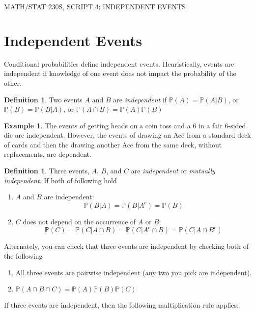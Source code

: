 \documentclass[12pt]{article}
\newcommand{\bbP}{\mathbb{P}}
\renewcommand{\_}[1]{\underline{ #1 }}
\theoremstyle{definition}
\newtheorem{definition}[theorem]{Definition}
\newtheorem{example}[theorem]{Example}
\numberwithin{equation}{subsection}
\begin{document}
\begin{center}
{\large MATH/STAT 230S, SCRIPT 4: INDEPENDENT EVENTS} \\ 
\vspace{.2in}  

\end{center}


\setcounter{section}{3}



\section{Independent Events}
Conditional probabilities define independent events. Heuristically, events are independent if knowledge of one event does not impact the probability of the other.
\begin{definition}
Two events $A$ and $B$ are \emph{independent} if $\bbP(A)=\bbP(A|B)$, or $\bbP(B)=\bbP(B|A)$, or $\bbP(A\cap B)=\bbP(A)\bbP(B)$
\end{definition}

\begin{example}
The events of getting heads on a coin toss and a 6 in a fair 6-sided die are independent. However, the events of drawing an Ace from a standard deck of cards and then the drawing another Ace from the same deck, without replacements, are dependent.
\end{example}

\begin{definition}
Three events, $A$, $B$, and $C$ are \emph{independent} or \emph{mutually independent}. If both of following hold
  \begin{enumerate}
    \item $A$ and $B$ are independent: \[\bbP(B|A)=\bbP(B|A^c)=\bbP(B)\]
     
     \item $C$ does not depend on the occurrence of $A$ or $B$: \[\bbP(C)=\bbP(C|A\cap B)=\bbP(C|A^c\cap B)=\bbP(C|A\cap B^c)\]
     \end{enumerate}
     Alternately, you can check that three events are independent by checking both of the following
     \begin{enumerate}
     \item All three events are pairwise independent (any two you pick are independent).
     \item $\mathbb{P}(A\cap B\cap C)=\mathbb{P}(A)\mathbb{P}(B)\mathbb{P}(C)$
  \end{enumerate}
\end{definition}
    If three events are independent, then the following multiplication rule applies:
  
\end{document}
